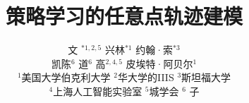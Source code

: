 \documentclass[conference]{IEEEtran}
\begin{document}
\title{策略学习的任意点轨迹建模}

\author{文 $^{*1,2,5}$ \quad 兴林$^{*1}$ \quad 约翰·索$^{*3}$ \\
凯陈$^{6}$ \quad 道$^{6}$ \quad 高$^{2,4,5}$ \quad 皮埃特·阿贝尔$^{1}$ \\
$^{1}$美国大学伯克利大学 \quad $^{2}$华大学的IIIS \quad $^{3}$斯坦福大学 \\
$^{4}$上海人工智能实验室 \quad $^{5}$城学会 \quad $^{6}$ 子 \\
}





% 
\end{document}
